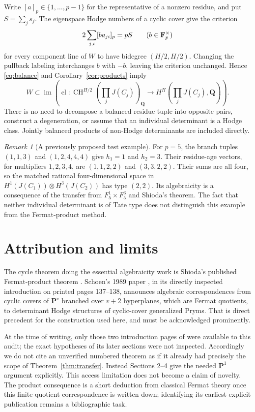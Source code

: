 \documentclass[11pt]{article}
\theoremstyle{remark}\newtheorem{remark}[theorem]{Remark}
\newcommand{\Q}{\mathbf Q}\newcommand{\C}{\mathbf C}
\newcommand{\CH}{\operatorname{CH}}\newcommand{\Sym}{\operatorname{Sym}}
\newcommand{\im}{\operatorname{im}}\newcommand{\id}{\operatorname{id}}
\newcommand{\cl}{\operatorname{cl}}\newcommand{\Gal}{\operatorname{Gal}}
\begin{document}
Write $[a]_p\in\{1,\ldots,p-1\}$ for the representative of a nonzero
residue, and put $S=\sum_js_j$. The eigenspace Hodge numbers of a cyclic
cover give the criterion
\begin{equation}\label{eq:balance}
 2\sum_{j,i}[b a_{ji}]_p=pS\qquad (b\in\mathbf F_p^\times)
\end{equation}
for every component line of $W$ to have bidegree $(H/2,H/2)$.
Changing the pullback labeling interchanges $b$ with $-b$, leaving the
criterion unchanged. Hence \eqref{eq:balance} and
Corollary~\ref{cor:products} imply
\[
 W\subset\im\left(\cl:\CH^{H/2}\left(\prod_jJ(C_j)\right)_\Q
                       \longrightarrow H^H\left(\prod_jJ(C_j),\Q\right)\right).
\]
There is no need to decompose a balanced residue tuple into opposite pairs,
construct a degeneration, or assume that an individual determinant is a
Hodge class. Jointly balanced products of non-Hodge determinants are
included directly.

\begin{remark}[A previously proposed test example]
For $p=5$, the branch tuples $(1,1,3)$ and $(1,2,4,4,4)$ give $h_1=1$
and $h_2=3$. Their residue-age vectors, for multipliers $1,2,3,4$, are
$(1,1,2,2)$ and $(3,3,2,2)$. Their sums are all four, so the matched
rational four-dimensional space in
$H^1(J(C_1))\otimes H^3(J(C_2))$ has type $(2,2)$.
Its algebraicity is a consequence of the transfer from
$F_5^1\times F_5^3$ and Shioda's theorem. The fact that neither individual
determinant is of Tate type does not distinguish this example from the
Fermat-product method.
\end{remark}

\section{Attribution and limits}
The cycle theorem doing the essential algebraicity work is Shioda's
published Fermat-product theorem \cite{Shioda79}. Schoen's 1989 paper
\cite{Schoen89}, in its directly inspected introduction on printed pages
137--138, announces algebraic correspondences from cyclic covers of
$\mathbf P^v$ branched over $v+2$ hyperplanes, which are Fermat quotients,
to determinant Hodge structures of cyclic-cover generalized Pryms.
That is direct precedent for the construction used here, and must be
acknowledged prominently.

At the time of writing, only those two introduction pages of
\cite{Schoen89} were available to this audit; the exact hypotheses of its
later sections were not inspected. Accordingly we do not cite an
unverified numbered theorem as if it already had precisely the scope of
Theorem~\ref{thm:transfer}. Instead Sections 2--4 give the needed
$\mathbf P^1$ argument explicitly. This access limitation does not become
a claim of novelty. The product consequence is a short deduction from
classical Fermat theory once this finite-quotient correspondence is written
down; identifying its earliest explicit publication remains a bibliographic
task.
\end{document}
